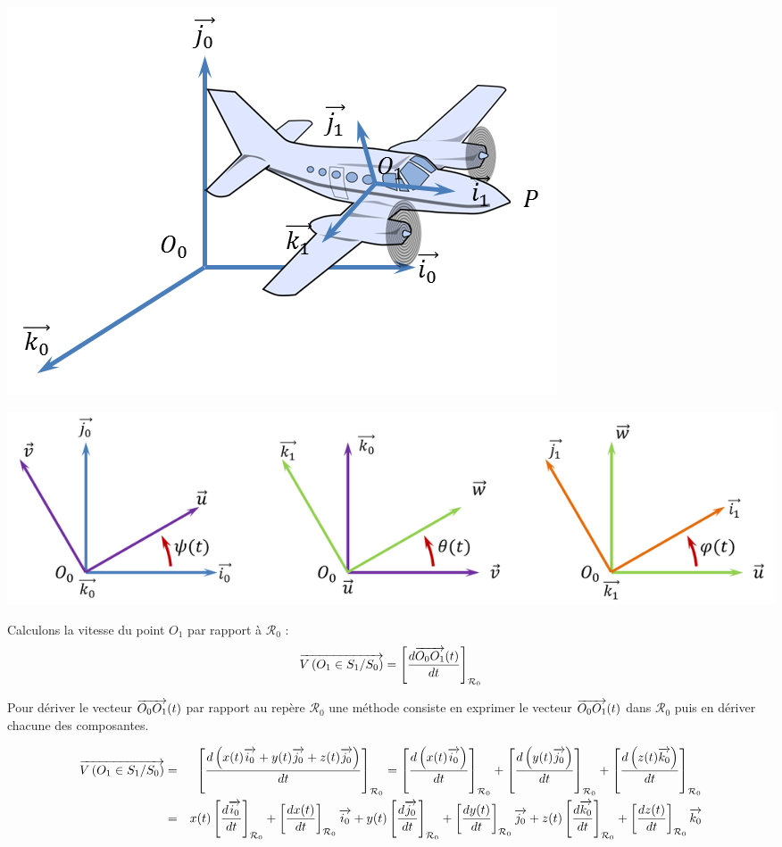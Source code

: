 \documentclass[10pt,oneside]{article}
\begin{document}
\begin{minipage}[c]{.3\linewidth}
\begin{center}
\includegraphics[width=.95\textwidth]{png/cessna}
\end{center}
\end{minipage}\hfill
\begin{minipage}[c]{.65\linewidth}
\begin{center}
\includegraphics[width=.95\textwidth]{png/euler}
\end{center}
\end{minipage}


Calculons la vitesse du point $O_1$ par rapport à $\mathcal{R}_0$ :
$$
\overrightarrow{V\left( {O_1} \in {S_1}/{S_0}\right)} =  \left[\dfrac{d\overrightarrow{O_0 O_1}(t)}{dt}\right]_{\mathcal{R}_0} 
$$

\begin{rem}
Pour dériver le vecteur $\overrightarrow{O_0 O_1}(t)$ par rapport au repère $\mathcal{R}_0$ une méthode consiste en exprimer le vecteur $\overrightarrow{O_0 O_1}(t)$ dans $\mathcal{R}_0$ puis en dériver chacune des composantes. 
\end{rem}

\begin{eqnarray*}
\overrightarrow{V\left( {O_1} \in {S_1}/{S_0}\right)} &=&  
\left[\dfrac{d\left(x(t)\overrightarrow{i_0}+y(t)\overrightarrow{j_0}+z(t)\overrightarrow{j_0} \right)}{dt}\right]_{\mathcal{R}_0}
= 
\left[\dfrac{d\left(x(t)\overrightarrow{i_0}\right)}{dt}\right]_{\mathcal{R}_0}
+\left[\dfrac{d\left(y(t)\overrightarrow{j_0}\right)}{dt}\right]_{\mathcal{R}_0}
+\left[\dfrac{d\left(z(t)\overrightarrow{k_0}\right)}{dt}\right]_{\mathcal{R}_0} \\
&=&
x(t)\left[\dfrac{d\overrightarrow{i_0}}{dt}\right]_{\mathcal{R}_0}
+ \left[\dfrac{dx(t)}{dt}\right]_{\mathcal{R}_0} \overrightarrow{i_0}
+y(t)\left[\dfrac{d\overrightarrow{j_0}}{dt}\right]_{\mathcal{R}_0}
+ \left[\dfrac{dy(t)}{dt}\right]_{\mathcal{R}_0} \overrightarrow{j_0}
+z(t)\left[\dfrac{d\overrightarrow{k_0}}{dt}\right]_{\mathcal{R}_0}
+ \left[\dfrac{dz(t)}{dt}\right]_{\mathcal{R}_0} \overrightarrow{k_0} \\
\end{eqnarray*}
\end{document}
